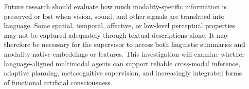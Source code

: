 Future research should evaluate how much modality-specific information is preserved or lost when vision, sound, and other signals are translated into language. Some spatial, temporal, affective, or low-level perceptual properties may not be captured adequately through textual descriptions alone. It may therefore be necessary for the supervisor to access both linguistic summaries and modality-native embeddings or features. This investigation will examine whether language-aligned multimodal agents can support reliable cross-modal inference, adaptive planning, metacognitive supervision, and increasingly integrated forms of functional artificial consciousness.